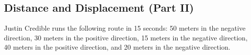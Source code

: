 \documentclass[answers]{exam}
\begin{document}
\begin{questions}
\begin{parts}
\end{parts}

\clearpage
\begin{EnvUplevel}
    \subsection{Distance and Displacement (Part II)}
\end{EnvUplevel}

\question
Justin Credible runs the following route in 15 seconds: 50 meters in the negative direction, 30 meters in the positive direction, 15 meters in the negative direction, 40 meters in the positive direction, and 20 meters in the negative direction. 

\end{questions}
\end{document}
